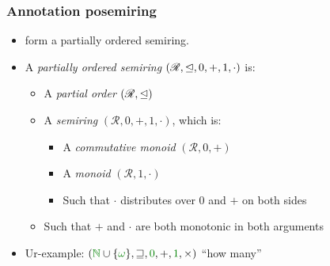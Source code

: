 \documentclass[fleqn]{beamer}
\begin{document}
\begin{frame}
  \frametitle{Annotation posemiring}
  \begin{itemize}
  \item {} form a partially ordered semiring.
  \item A \emph{partially ordered semiring}
    $(\mathscr R, \trianglelefteq, 0, +, 1, \cdot)$ is:
    \begin{itemize}
    \item A \emph{partial order} $(\mathscr R, \trianglelefteq)$
    \item A \emph{semiring} $(\mathscr R, 0, +, 1, \cdot)$, which is:
      \begin{itemize}
      \item A \emph{commutative monoid} $(\mathscr R , 0, +)$
      \item A \emph{monoid} $(\mathscr R , 1, \cdot)$
      \item Such that $\cdot$ distributes over $0$ and $+$ on both sides
      \end{itemize}
    \item Such that $+$ and $\cdot$ are both monotonic in both arguments
    \end{itemize}
    \pause
  \item Ur-example:
    $(\rescomment{\mathbb N} \cup \{\rescomment\omega\}, \sqsupseteq,
    \rescomment 0, +, \rescomment 1, \times)$ ``how many''
  \end{itemize}
\end{frame}
\end{document}
